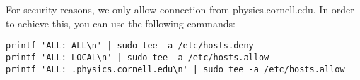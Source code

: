 \documentclass[12pt]{article}
\begin{document}
For security reasons, we only allow connection from physics.cornell.edu.
In order to achieve this, you can use the following commands:
\begin{Verbatim}
printf 'ALL: ALL\n' | sudo tee -a /etc/hosts.deny
printf 'ALL: LOCAL\n' | sudo tee -a /etc/hosts.allow
printf 'ALL: .physics.cornell.edu\n' | sudo tee -a /etc/hosts.allow
\end{Verbatim}
\end{document}
